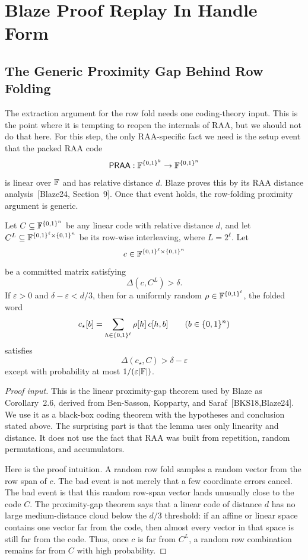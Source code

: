 \section{Blaze Proof Replay In Handle Form}

\subsection{The Generic Proximity Gap Behind Row Folding}

The extraction argument for the row fold needs one coding-theory input.  This is
the point where it is tempting to reopen the internals of RAA, but we should not
do that here.  For this step, the only RAA-specific fact we need is the setup
event that the packed RAA code
\[
  \mathsf{PRAA}:\mathbb{F}^{\{0,1\}^k}\to\mathbb{F}^{\{0,1\}^n}
\]
is linear over \(\mathbb{F}\) and has relative distance \(d\).  Blaze proves this by
its RAA distance analysis~[Blaze24, Section~9].  Once that event holds, the
row-folding proximity argument is generic.

\begin{lemma}
\label{lem:row-fold-proximity-gap}
Let \(C\subseteq\mathbb{F}^{\{0,1\}^n}\) be any linear code with relative distance \(d\), and
let \(C^L\subseteq\mathbb{F}^{\{0,1\}^\ell\times\{0,1\}^n}\) be its row-wise interleaving, where
\(L=2^\ell\).  Let
\[
  c\in\mathbb{F}^{\{0,1\}^\ell\times\{0,1\}^n}
\]
be a committed matrix satisfying
\[
  \Delta(c,C^L)>\delta.
\]
If \(\varepsilon>0\) and \(\delta-\varepsilon<d/3\), then for a uniformly random
\(\rho\in\mathbb{F}^{\{0,1\}^\ell}\), the folded word
\[
  c_\star[b]
  =
  \sum_{h\in\{0,1\}^\ell}\rho[h]\,c[h,b]
  \qquad(b\in\{0,1\}^n)
\]
satisfies
\[
  \Delta(c_\star,C)>\delta-\varepsilon
\]
except with probability at most \(1/(\varepsilon|\mathbb{F}|)\).
\end{lemma}

\begin{proof}[Proof input]
This is the linear proximity-gap theorem used by Blaze as Corollary~2.6,
derived from Ben-Sasson, Kopparty, and Saraf~[BKS18,Blaze24].  We use it as a
black-box coding theorem with the hypotheses and conclusion stated above.  The
surprising part is that the lemma uses only linearity and distance.  It does
not use the fact that RAA was built from repetition, random permutations, and
accumulators.

Here is the proof intuition.  A random row fold samples a random vector from the
row span of \(c\).  The bad event is not merely that a few coordinate errors
cancel.  The bad event is that this random row-span vector lands unusually close
to the code \(C\).  The proximity-gap theorem says that a linear code of
distance \(d\) has no large medium-distance cloud below the \(d/3\) threshold:
if an affine or linear space contains one vector far from the code, then almost
every vector in that space is still far from the code.  Thus, once \(c\) is far
from \(C^L\), a random row combination remains far from \(C\) with high
probability.
\end{proof}

